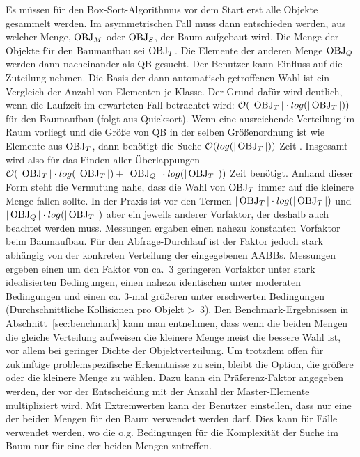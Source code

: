 Es müssen für den Box-Sort-Algorithmus vor dem Start erst alle Objekte gesammelt werden. Im asymmetrischen Fall muss dann entschieden werden, aus welcher Menge, $\operatorname{OBJ}_M$ oder $\operatorname{OBJ}_S$, der Baum aufgebaut wird. Die Menge der Objekte für den Baumaufbau sei $\operatorname{OBJ}_T$. Die Elemente der anderen Menge $\operatorname{OBJ}_Q$ werden dann nacheinander als QB gesucht. Der Benutzer kann Einfluss auf die Zuteilung nehmen. Die Basis der dann automatisch getroffenen Wahl ist ein Vergleich der Anzahl von Elementen je Klasse. Der Grund dafür wird deutlich, wenn die Laufzeit im erwarteten Fall betrachtet wird: $\mathcal{O}(|\operatorname{OBJ}_T|\cdot log(|\operatorname{OBJ}_T|))$ für den Baumaufbau (folgt aus Quicksort). Wenn eine ausreichende Verteilung im Raum vorliegt und die Größe von QB in der selben Größenordnung ist wie Elemente aus $\operatorname{OBJ}_T$, dann benötigt die Suche $\mathcal{O}(log(|\operatorname{OBJ}_T|))$ Zeit \cite[Abstract]{houthuys1987box}. Insgesamt wird also für das Finden aller Überlappungen $\mathcal{O}(|\operatorname{OBJ}_T|\cdot log(|\operatorname{OBJ}_T|)+|\operatorname{OBJ}_Q|\cdot log(|\operatorname{OBJ}_T|))$ Zeit benötigt. Anhand dieser Form steht die Vermutung nahe, dass die Wahl von $\operatorname{OBJ}_T$ immer auf die kleinere Menge fallen sollte. In der Praxis ist vor den Termen $|\operatorname{OBJ}_T|\cdot log(|\operatorname{OBJ}_T|)$ und $|\operatorname{OBJ}_Q|\cdot log(|\operatorname{OBJ}_T|)$ aber ein jeweils anderer Vorfaktor, der deshalb auch beachtet werden muss. Messungen ergaben einen nahezu konstanten Vorfaktor beim Baumaufbau. Für den Abfrage-Durchlauf  ist der Faktor jedoch stark abhängig von der konkreten Verteilung der eingegebenen AABBs. Messungen ergeben einen um den Faktor von ca.~3 geringeren Vorfaktor unter stark idealisierten Bedingungen, einen nahezu identischen unter moderaten Bedingungen und einen ca. 3-mal größeren unter erschwerten Bedingungen (Durchschnittliche Kollisionen pro Objekt \textgreater ~3). Den Benchmark-Ergebnissen in Abschnitt~\ref{sec:benchmark} kann man entnehmen, dass wenn die beiden Mengen die gleiche Verteilung aufweisen die kleinere Menge meist die bessere Wahl ist, vor allem bei geringer Dichte der Objektverteilung. Um trotzdem offen für zukünftige problemspezifische Erkenntnisse zu sein, bleibt die Option, die größere oder die kleinere Menge zu wählen. Dazu kann ein Präferenz-Faktor angegeben werden, der vor der Entscheidung mit der Anzahl der Master-Elemente multipliziert wird. Mit Extremwerten kann der Benutzer einstellen, dass nur eine der beiden Mengen für den Baum verwendet werden darf. Dies kann für Fälle verwendet werden, wo die o.g. Bedingungen für die Komplexität der Suche im Baum nur für eine der beiden Mengen zutreffen.\\

